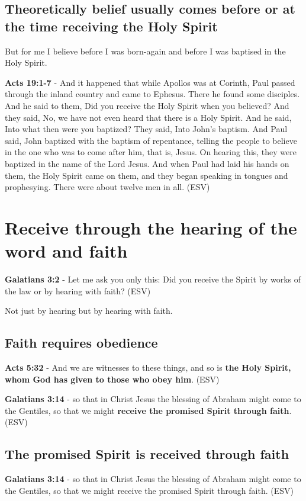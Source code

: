 \documentclass[11pt]{article}
\begin{document}
\subsection{Theoretically belief usually comes before or at the time receiving the Holy Spirit}
\label{sec:org12e3443}
But for me I believe before I was born-again and before I was baptised in the Holy Spirit.

\textbf{Acts 19:1-7} - And it happened that while Apollos was at Corinth, Paul passed through the inland country and came to Ephesus. There he found some disciples. And he said to them, Did you receive the Holy Spirit when you believed? And they said, No, we have not even heard that there is a Holy Spirit. And he said, Into what then were you baptized? They said, Into John's baptism. And Paul said, John baptized with the baptism of repentance, telling the people to believe in the one who was to come after him, that is, Jesus. On hearing this, they were baptized in the name of the Lord Jesus. And when Paul had laid his hands on them, the Holy Spirit came on them, and they began speaking in tongues and prophesying. There were about twelve men in all. (ESV)

\section{Receive through the hearing of the word and faith}
\label{sec:orge434919}
\textbf{Galatians 3:2} - Let me ask you only this: Did you receive the Spirit by works of the law or by hearing with faith? (ESV)

Not just by hearing but by hearing with faith.

\subsection{Faith requires obedience}
\label{sec:orgb061790}
\textbf{Acts 5:32} - And we are witnesses to these things, and so is \textbf{the Holy Spirit, whom God has given to those who obey him}. (ESV)

\textbf{Galatians 3:14} - so that in Christ Jesus the blessing of Abraham might come to the Gentiles, so that we might \textbf{receive the promised Spirit through faith}. (ESV)

\subsection{The promised Spirit is received through faith}
\label{sec:org19ae0e2}
\textbf{Galatians 3:14} - so that in Christ Jesus the blessing of Abraham might come to the Gentiles, so that we might receive the promised Spirit through faith. (ESV)
\end{document}
